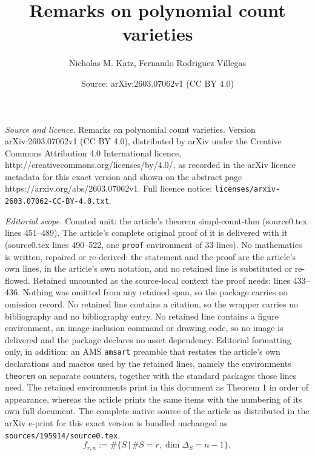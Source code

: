 \documentclass[10pt,a4paper]{amsart}
\title{Remarks on polynomial count varieties}
\author{Nicholas M. Katz, Fernando Rodriguez Villegas}
\date{Source: arXiv:2603.07062v1 (CC BY 4.0)}
\begin{document}
\maketitle

\noindent\emph{Source and licence.} Remarks on polynomial count varieties. Version arXiv:2603.07062v1 (CC BY 4.0), distributed by arXiv under the Creative Commons Attribution 4.0 International licence, http://creativecommons.org/licenses/by/4.0/, as recorded in the arXiv licence metadata for this exact version and shown on the abstract page https://arxiv.org/abs/2603.07062v1. Full licence notice: \texttt{licenses/arxiv-2603.07062-CC-BY-4.0.txt}.\par\smallskip

\noindent\textit{Editorial scope.} Counted unit: the article's theorem simpl-count-thm (source0.tex lines 451--489). The article's complete original proof of it is delivered with it (source0.tex lines 490--522, one \texttt{proof} environment of 33 lines). No mathematics is written, repaired or re-derived: the statement and the proof are the article's own lines, in the article's own notation, and no retained line is substituted or re-flowed.  Retained uncounted as the source-local context the proof needs: lines 433--436.  Nothing was omitted from any retained span, so the package carries no omission record.  No retained line contains a citation, so the wrapper carries no bibliography and no bibliography entry.  No retained line contains a figure environment, an image-inclusion command or drawing code, so no image is delivered and the package declares no asset dependency.  Editorial formatting only, in addition: an AMS \texttt{amsart} preamble that restates the article's own declarations and macros used by the retained lines, namely the environments \texttt{theorem} on separate counters, together with the standard packages those lines need.  The retained environments print in this document as Theorem 1 in order of appearance, whereas the article prints the same items with the numbering of its own full document.  The complete native source of the article as distributed in the arXiv e-print for this exact version is bundled unchanged as \texttt{sources/195914/source0.tex}.
\begin{equation}
\label{f-defn}
f_{r,n}:=\#\{S \,|\, \#S=r, \dim \Delta_S=n-1\},
\end{equation}
\end{document}
